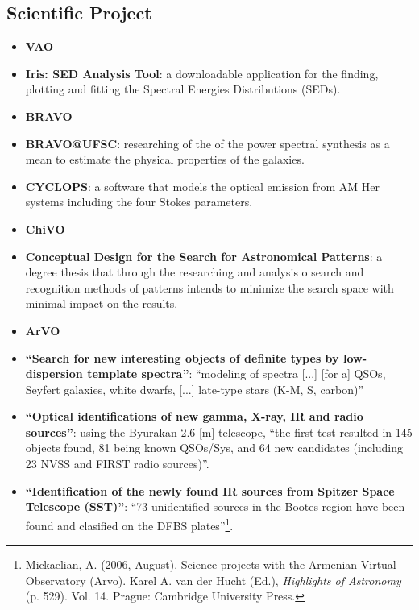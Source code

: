 \subsection{Scientific Project}
\begin{itemize}
\item \textbf{VAO}
\item \textbf{Iris: SED Analysis Tool}:
a downloadable application for the finding, plotting and fitting the Spectral
Energies Distributions (SEDs). 

\item \textbf{BRAVO}
\item \textbf{BRAVO@UFSC}:
researching of the of the power spectral synthesis as a mean to estimate the
physical properties of the galaxies.

\item \textbf{CYCLOPS}:
a software that models the optical emission from AM Her systems including the
four Stokes parameters.

\item \textbf{ChiVO}
\item  \textbf{Conceptual Design for the Search for Astronomical Patterns}:
 a degree thesis that through the researching and analysis o search and
recognition methods of patterns intends to minimize the search space with
minimal impact on the results. 

\item \textbf{ArVO}
\item \textbf{``Search for new interesting objects of definite types by
low-dispersion template spectra''}:
``modeling of spectra [...] [for a] QSOs, Seyfert galaxies, white dwarfs, [...]
late-type stars (K-M, S, carbon)'' 

\item \textbf{``Optical identifications of new gamma, X-ray, IR and radio
sources''}:
using the Byurakan 2.6 [m] telescope, ``the first test resulted in 145 objects
found, 81 being known QSOs/Sys, and 64 new candidates (including 23 NVSS and
FIRST radio sources)''.

\item \textbf{``Identification of the newly found IR sources from Spitzer Space
Telescope (SST)''}:
``73 unidentified sources in the Bootes region have been found and clasified on
the DFBS plates''\footnote{Mickaelian, A. (2006, August). Science projects with
the Armenian Virtual Observatory (Arvo). Karel A.  van der Hucht (Ed.),
\textit{Highlights of Astronomy} (p. 529). Vol. 14. Prague: Cambridge University
Press.}.


\end{itemize}

